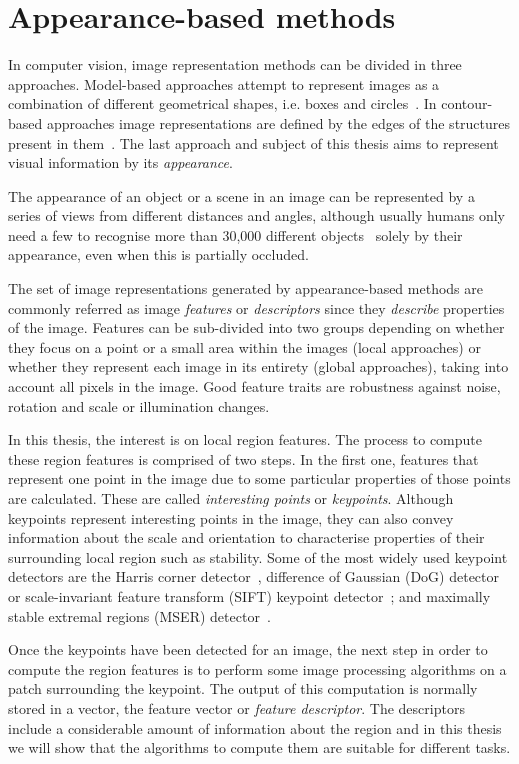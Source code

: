 \section{Appearance-based methods}

In computer vision, image representation methods can be divided in three approaches. Model-based approaches attempt to represent images as a combination of different geometrical shapes, i.e. boxes and circles~\cite{biederman1987}. In contour-based approaches image representations are defined by the edges of the structures present in them~\cite{canny1986computational}. The last approach and subject of this thesis aims to represent visual information by its \textit{appearance}. 

The appearance of an object or a scene in an image can be represented by a series of views from different distances and angles, although usually humans only need a few to recognise more than 30,000 different objects~\cite{biederman1987recognition} solely by their appearance, even when this is partially occluded. 

The set of image representations generated by appearance-based methods are commonly referred as image \textit{features} or \textit{descriptors} since they \textit{describe} properties of the image. Features can be sub-divided into two groups depending on whether they focus on a point or a small area within the images (local approaches) or whether they represent each image in its entirety (global approaches), taking into account all pixels in the image. Good feature traits are robustness against noise, rotation and scale or illumination changes. 

In this thesis, the interest is on local region features. The process to compute these region features is comprised of two steps. In the first one, features that represent one point in the image due to some particular properties of those points are calculated. These are called \textit{interesting points} or \textit{keypoints}. Although keypoints represent interesting points in the image, they can also convey information about the scale and orientation to characterise properties of their
surrounding local region such as stability. Some of the most widely used keypoint detectors are the Harris corner detector~\cite{harris1988combined}, difference of Gaussian (DoG) detector or scale-invariant feature transform (SIFT) keypoint detector~\cite{lowe2004}; and maximally stable extremal regions (MSER) detector~\cite{matas2004robust}.

Once the keypoints have been detected for an image, the next step in order to compute the region features is to perform some image processing algorithms on a patch surrounding the keypoint. The output of this computation is normally stored in a vector, the feature vector or \textit{feature descriptor}. The descriptors include a considerable amount of information about the region and in this thesis we will show that the algorithms to compute them 	are suitable for different tasks.

